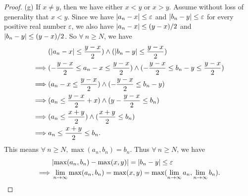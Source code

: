 \begin{proof}{(g)}
    If \(x \neq y\), then we have either \(x < y\) or \(x > y\).
    Assume without loss of generality that \(x < y\).
    Since we have \(\abs*{a_n - x} \leq \varepsilon\) and \(\abs*{b_n - y} \leq \varepsilon\) for every positive real number \(\varepsilon\), we also have \(\abs*{a_n - x} \leq (y - x) / 2\) and \(\abs*{b_n - y} \leq (y - x) / 2\).
    So \(\forall\ n \geq N\), we have
    \begin{align*}
                 & (\abs*{a_n - x} \leq \frac{y - x}{2}) \land (\abs*{b_n - y} \leq \frac{y - x}{2})                               \\
        \implies & (-\frac{y - x}{2} \leq a_n - x \leq \frac{y - x}{2}) \land (-\frac{y - x}{2} \leq b_n - y \leq \frac{y - x}{2}) \\
        \implies & (a_n - x \leq \frac{y - x}{2}) \land (-\frac{y - x}{2} \leq b_n - y)                                            \\
        \implies & (a_n \leq \frac{y - x}{2} + x) \land (y - \frac{y - x}{2} \leq b_n)                                             \\
        \implies & (a_n \leq \frac{x + y}{2}) \land (\frac{x + y}{2} \leq b_n)                                                     \\
        \implies & a_n \leq \frac{x + y}{2} \leq b_n.
    \end{align*}
    This means \(\forall\ n \geq N, \max(a_n, b_n) = b_n\).
    Thus \(\forall\ n \geq N\), we have
    \begin{align*}
                 & \abs*{\max(a_n, b_n) - \max(x, y)} = \abs*{b_n - y} \leq \varepsilon                                      \\
        \implies & \lim_{n \to \infty} \max(a_n, b_n) = \max(x, y) = \max(\lim_{n \to \infty} a_n, \lim_{n \to \infty} b_n).
    \end{align*}
\end{proof}

